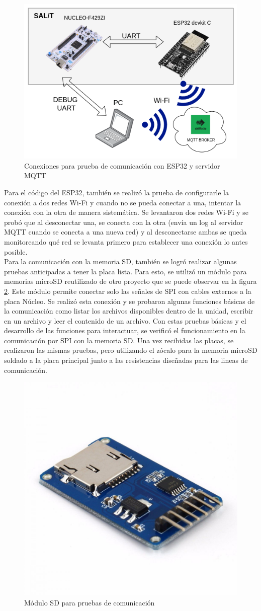 \begin{figure}[H]
    \centering
    \includegraphics[width = 0.7\linewidth]{img/mqtt_testbench.png}
    \caption{Conexiones para prueba de comunicación con ESP32 y servidor MQTT}
    \label{fig:mqtt_testbench}
\end{figure}

Para el código del ESP32, también se realizó la prueba de configurarle la conexión a dos redes Wi-Fi y cuando no se pueda conectar a una, intentar la conexión con la otra de manera sistemática. Se levantaron dos redes Wi-Fi y se probó que al desconectar una, se conecta con la otra (envía un log al servidor MQTT cuando se conecta a una nueva red) y al desconectarse ambas se queda monitoreando qué red se levanta primero para establecer una conexión lo antes posible. \\ 

Para la comunicación con la memoria SD, también se logró realizar algunas pruebas anticipadas a tener la placa lista. Para esto, se utilizó un módulo para memorias microSD \cite{modulo_sd} reutilizado de otro proyecto que se puede observar en la figura \ref{fig:modulo_sd}. Este módulo permite conectar solo las señales de SPI con cables externos a la placa Núcleo. Se realizó esta conexión y se probaron algunas funciones básicas de la comunicación como listar los archivos disponibles dentro de la unidad, escribir en un archivo y leer el contenido de un archivo. Con estas pruebas básicas y el desarrollo de las funciones para interactuar, se verificó el funcionamiento en la comunicación por SPI con la memoria SD. Una vez recibidas las placas, se realizaron las mismas pruebas, pero utilizando el zócalo para la memoria microSD soldado a la placa principal junto a las resistencias diseñadas para las lineas de comunicación. 

\begin{figure}[H]
    \centering
    \includegraphics[width = 0.4\linewidth]{img/modulo_sd.jpg}
    \caption{Módulo SD para pruebas de comunicación}
    \label{fig:modulo_sd}
\end{figure}

